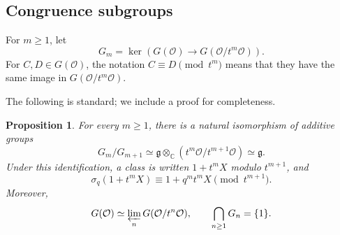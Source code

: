 \documentclass[11pt]{amsart}
\numberwithin{equation}{section}
\newtheorem{proposition}[proposition]{Proposition}
\theoremstyle{definition}
\theoremstyle{remark}
\begin{document}
\subsection{Congruence subgroups}

For $m\geq1$, let
\[
  G_m=\ker\left(G\left(\mathcal{O}\right)\longrightarrow
  G\left(\mathcal{O}/t^m\mathcal{O}\right)\right).
\]
For $C,D\in G(\mathcal{O})$, the notation
$C\equiv D\pmod{t^m}$ means that they have the same image in
$G(\mathcal{O}/t^m\mathcal{O})$.

The following is standard; we include a proof for completeness.
\begin{proposition}
\label{lem:congruence}
For every $m\geq1$, there is a natural isomorphism of additive groups
\begin{equation}\label{eq:graded}
  G_m/G_{m+1}\simeq
  \mathfrak{g}\otimes_{\mathbb{C}}
  (t^m\mathcal{O}/t^{m+1}\mathcal{O})\simeq\mathfrak{g}.
\end{equation}
Under this identification, a class is written $1+t^mX$ modulo $t^{m+1}$,
and
\[
  \sigma_q(1+t^mX)\equiv1+q^mt^mX\pmod{t^{m+1}}.
\]
Moreover,
\begin{equation}\label{eq:completion}
  G(\mathcal{O})\simeq
  \varprojlim_nG(\mathcal{O}/t^n\mathcal{O}),
  \qquad
  \bigcap_{n\geq1}G_n=\{1\}.
\end{equation}
\end{proposition}
\end{document}
